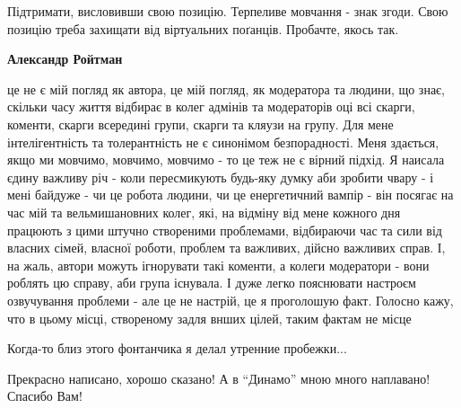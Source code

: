 \begin{itemize}
\begin{itemize}
\begin{itemize}
Підтримати, висловивши свою позицію. Терпеливе мовчання - знак згоди. Свою
позицію треба захищати від віртуальних поґанців. Пробачте, якось так.

\end{itemize} %

\textbf{Александр Ройтман} 

це не є мій погляд як автора, це мій погляд, як модератора та людини, що знає,
скільки часу життя відбирає в колег адмінів та модераторів оці всі скарги,
коменти, скарги всередині групи, скарги та кляузи на групу. Для мене
інтелігентність та толерантність не є синонімом безпорадності. Меня здається,
якщо ми мовчимо, мовчимо, мовчимо - то це теж не є вірний підхід. Я наисала
єдину важливу річ - коли пересмикують будь-яку думку аби зробити чвару - і мені
байдуже - чи це робота людини, чи це енергетичний вампір - він посягає на час
мій та вельмишановних колег, які, на відміну від мене кожного дня працюють з
цими штучно створеними проблемами, відбираючи час та сили від власних сімей,
власної роботи, проблем та важливих, дійсно важливих справ. І, на жаль, автори
можуть ігнорувати такі коменти, а колеги модератори - вони роблять цю справу,
аби група існувала. І дуже легко пояснювати настроєм озвучування проблеми - але
це не настрій, це я проголошую факт. Голосно кажу, что в цьому місці,
створеному задля внших цілей, таким фактам не місце

\end{itemize} %

Когда-то близ этого фонтанчика я делал утренние пробежки...


Прекрасно написано, хорошо сказано! А в \enquote{Динамо} мною много наплавано!
Спасибо Вам!

\end{itemize} %
